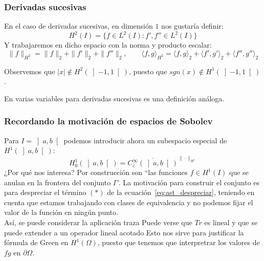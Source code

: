 \subsubsection{Derivadas sucesivas}
\noindent
En el caso de derivadas sucesivas, en dimensión $1$ nos gustaría definir:
\begin{equation*}
    H^2(I) = \{f\in L^2(I) : f',f''\in L^2(I)\}
\end{equation*}
Y trabajaremos en dicho espacio con la norma y producto escalar:
\begin{equation*}
    \|f\|_{H^2} = \|f\|_2 + \|f'\|_2 + \|f''\|_2, \qquad \langle f,g \rangle_{H^2} = \langle f,g \rangle_2 + \langle f',g' \rangle_2 + \langle f'',g'' \rangle_2
\end{equation*}

\begin{ejemplo}
    Observemos que $|x|\notin H^2(\left]-1,1\right[)$, puesto que $sgn(x)\notin H^1(\left]-1,1\right[)$.
\end{ejemplo}

\noindent
En varias variables para derivadas sucesivas es una definición análoga.\\

\subsubsection{Recordando la motivación de espacios de Sobolev}
\noindent
Para $I = \left]a,b\right[$ podemos introducir ahora un subespacio especial de $H^1(\left]a,b\right[)$:
\begin{equation*}
    H_0^1(\left]a,b\right[) = \overline{C^\infty_c(\left]a,b\right[)}^{\|\cdot \|_{H^1}}
\end{equation*}
¿Por qué nos interesa? Por construcción son ``las funciones $f\in H^1(I)$ que se anulan en la frontera del conjunto $I$''. La motivación para construir el conjunto es para despreciar el término $(\ast)$ de la ecuación~\eqref{eq:ast_despreciar}, teniendo en cuenta que estamos trabajando con clases de equivalencia y no podemos fijar el valor de la función en ningún punto.\\

\noindent
Así, se puede considerar la aplicación traza
Puede verse que $Tr$ es lineal y que se puede extender a un operador lineal acotado
Esto nos sirve para justificar la fórmula de Green en $H^1(\Omega)$, puesto que tenemos que interpretrar los valores de $fg$ en $\partial \Omega$.\\

